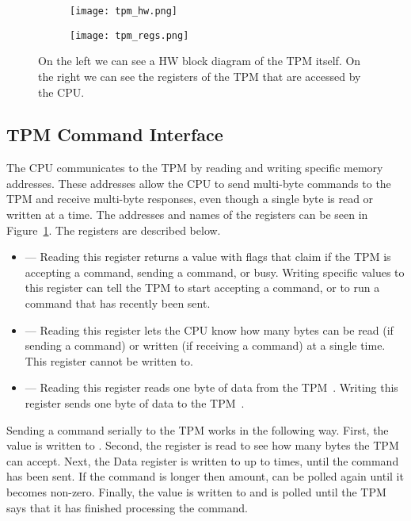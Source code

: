 \begin{figure}
  \centering
\begin{subfigure}{.4\textwidth}
  \centering
  \texttt{[image: tpm\_hw.png]}
\end{subfigure}
\begin{subfigure}{.40\textwidth}
  \centering
  \texttt{[image: tpm\_regs.png]}
\end{subfigure}
\caption[TPM Hardware Diagram]{On the left we can see a HW block diagram of the TPM
itself\cite{tpm-slides}. 
On the right we can see the registers of the TPM that are accessed by the CPU.}
\label{fig:tpm_hw}
\end{figure}


\subsection{TPM Command Interface}\label{tpm_cmd_regs}

The CPU communicates to the TPM by reading and writing specific memory addresses.
These addresses allow the CPU to send multi-byte commands to the TPM and receive multi-byte responses, even though a single byte is read or written at a time.
The addresses and names of the registers can be seen in Figure~\ref{fig:tpm_hw}.
The registers are described below.

\begin{itemize}
    \item {} --- Reading this register returns a value with flags
        that claim if the TPM is accepting a command, sending a command, or
        busy. Writing specific values to this register can tell the TPM to start
        accepting a command, or to run a command that has recently been sent.
    \item {} --- Reading this register lets the CPU know how many
        bytes can be read (if sending a command) or written (if receiving a
        command) at a single time. This register cannot be written to.
    \item {} --- Reading this register reads one byte of data from the TPM~. Writing this register sends one byte of data to the TPM~.
\end{itemize}

Sending a command serially to the TPM works in the following way.
First, the  value is written to .
Second, the  register is read to see how many bytes the TPM can accept.
Next, the Data register is written to up to  times, until the command has been sent.
If the command is longer then  amount,  can be polled again until it becomes non-zero.
Finally, the  value is written to  and  is polled until the TPM says that it has finished processing the command.

